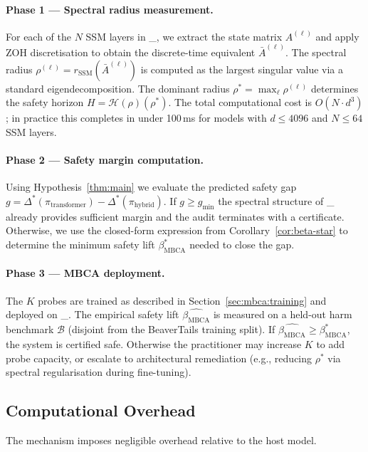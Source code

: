 \documentclass{article}
\newcommand{\rSSM}{r_{\mathrm{SSM}}}
\newcommand{\deltaStar}{\Delta^{*}}
\newcommand{\piHybrid}{\pi_{\mathrm{hybrid}}}
\newcommand{\piTrans}{\pi_{\mathrm{transformer}}}
\newcommand{\Horizon}{\mathcal{H}(\rho)}
\newcommand{\MBCA}{\mathrm{MBCA}}
\newcommand{\betaMBCA}{\beta_{\MBCA}}
\begin{document}
\paragraph{Phase 1 --- Spectral radius measurement.}
For each of the $N$ SSM layers in \piHybrid{}, we extract the state matrix
$A^{(\ell)}$ and apply ZOH discretisation to obtain the discrete-time equivalent
$\bar{A}^{(\ell)}$.  The spectral radius $\rho^{(\ell)} = \rSSM(\bar{A}^{(\ell)})$
is computed as the largest singular value via a standard eigendecomposition.  The
dominant radius $\rho^* = \max_\ell \rho^{(\ell)}$ determines the safety horizon
$H = \Horizon(\rho^*)$.  The total computational cost is $O(N \cdot d^3)$; in
practice this completes in under 100\,ms for models with $d \leq 4096$ and
$N \leq 64$ SSM layers.

\paragraph{Phase 2 --- Safety margin computation.}
Using Hypothesis~\ref{thm:main} we evaluate the predicted safety gap
$g = \deltaStar(\piTrans{}) - \deltaStar(\piHybrid{})$.  If $g \geq g_{\min}$
the spectral structure of \piHybrid{} already provides sufficient margin and the
audit terminates with a certificate.  Otherwise, we use the closed-form
expression from Corollary~\ref{cor:beta-star} to determine the minimum \MBCA{}
safety lift $\betaMBCA^*$ needed to close the gap.

\paragraph{Phase 3 --- MBCA deployment.}
The $K$ probes are trained as described in Section~\ref{sec:mbca:training} and
deployed on \piHybrid{}.  The empirical safety lift $\hat{\betaMBCA}$ is measured
on a held-out harm benchmark $\mathcal{B}$ (disjoint from the BeaverTails training
split).  If $\hat{\betaMBCA} \geq \betaMBCA^*$, the system is certified safe.
Otherwise the practitioner may increase $K$ to add probe capacity, or escalate
to architectural remediation (e.g., reducing $\rho^*$ via spectral
regularisation during fine-tuning).

\subsection{Computational Overhead}
\label{sec:mbca:overhead}

The \MBCA{} mechanism imposes negligible overhead relative to the host model.
\end{document}
